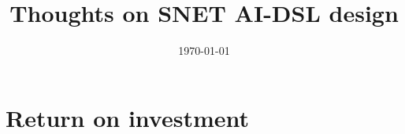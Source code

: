 \documentclass[]{scrartcl}
\title{Thoughts on SNET AI-DSL design}
\date{\today}
\begin{document}
	
	\maketitle
	\tableofcontents

\section{Return on investment}
\end{document}
